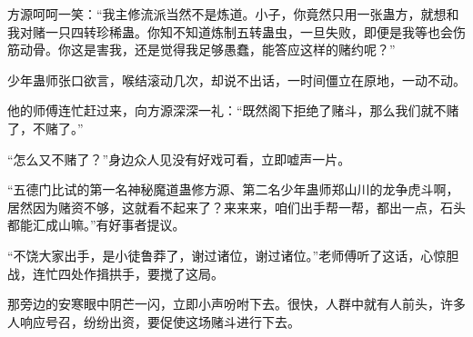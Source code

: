 \begin{this_body}
方源呵呵一笑：“我主修流派当然不是炼道。小子，你竟然只用一张蛊方，就想和我对赌一只四转珍稀蛊。你知不知道炼制五转蛊虫，一旦失败，即便是我等也会伤筋动骨。你这是害我，还是觉得我足够愚蠢，能答应这样的赌约呢？”

少年蛊师张口欲言，喉结滚动几次，却说不出话，一时间僵立在原地，一动不动。

他的师傅连忙赶过来，向方源深深一礼：“既然阁下拒绝了赌斗，那么我们就不赌了，不赌了。”

“怎么又不赌了？”身边众人见没有好戏可看，立即嘘声一片。

“五德门比试的第一名神秘魔道蛊修方源、第二名少年蛊师郑山川的龙争虎斗啊，居然因为赌资不够，这就看不起来了？来来来，咱们出手帮一帮，都出一点，石头都能汇成山嘛。”有好事者提议。

“不饶大家出手，是小徒鲁莽了，谢过诸位，谢过诸位。”老师傅听了这话，心惊胆战，连忙四处作揖拱手，要搅了这局。

那旁边的安寒眼中阴芒一闪，立即小声吩咐下去。很快，人群中就有人前头，许多人响应号召，纷纷出资，要促使这场赌斗进行下去。

\end{this_body}

